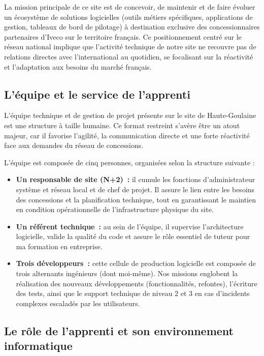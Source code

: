 La mission principale de ce site est de concevoir, de maintenir et de faire évoluer un écosystème de solutions logicielles (outils métiers spécifiques, applications de gestion, tableaux de bord de pilotage) à destination exclusive des concessionnaires partenaires d'Iveco sur le territoire français. Ce positionnement centré sur le réseau national implique que l'activité technique de notre site ne recouvre pas de relations directes avec l'international au quotidien, se focalisant sur la réactivité et l'adaptation aux besoins du marché français.

\subsection*{L'équipe et le service de l'apprenti}

L'équipe technique et de gestion de projet présente sur le site de Haute-Goulaine est une structure à taille humaine. Ce format restreint s'avère être un atout majeur, car il favorise l'agilité, la communication directe et une forte réactivité face aux demandes du réseau de concessions.

L'équipe est composée de cinq personnes, organisées selon la structure suivante :

\begin{itemize}
    \item \textbf{Un responsable de site (N+2)~:} il cumule les fonctions d'administrateur système et réseau local et de chef de projet. Il assure le lien entre les besoins des concessions et la planification technique, tout en garantissant le maintien en condition opérationnelle de l'infrastructure physique du site.
    \item \textbf{Un référent technique~:} au sein de l'équipe, il supervise l'architecture logicielle, valide la qualité du code et assure le rôle essentiel de tuteur pour ma formation en entreprise.
    \item \textbf{Trois développeurs~:} cette cellule de production logicielle est composée de trois alternants ingénieurs (dont moi-même). Nos missions englobent la réalisation des nouveaux développements (fonctionnalités, refontes), l'écriture des tests, ainsi que le support technique de niveau 2 et 3 en cas d'incidents complexes escaladés par les utilisateurs.
\end{itemize}

\subsection*{Le rôle de l'apprenti et son environnement informatique}

